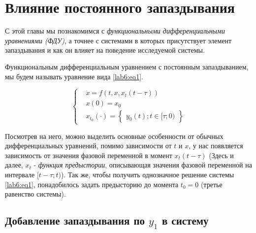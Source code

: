 %
%
\chapter{Влияние постоянного запаздывания}\label{lab6}

С этой главы мы познакомимся с \textit{функциональными дифференциальными
уравнениями (ФДУ)}, а точнее с системами в которых присутствует элемент
запаздывания и как он влияет на поведение исследуемой системы.

\begin{definition}
    Функциональным дифференциальным уравнением с постоянным запаздыванием,
    мы будем называть уравнение вида \ref{lab6:eq1}.
\end{definition}

\begin{equation}\label{lab6:eq1}
    \begin{cases}
        &\dot{x} = f(t, x, x_t(t - \tau)) \\
        &x(0) = x_0 \\
        &x_{t_0}(\cdot) = \begin{Bmatrix}y_0(t); t \in [\tau;0)\end{Bmatrix}
    \end{cases}
\end{equation}

Посмотрев на него, можно выделить основные особенности от обычных дифференциальных
уравнений, помимо зависимости от $t$ и $x$, у нас появляется зависимость от
значения фазовой переменной в момент $x_t(t-\tau)$ (Здесь и далее, $x_t$ - \textit{функция
предыстории}, описывающая значения фазовой переменной на интервале $[t-\tau;t)$).
Так же, чтобы получить однозначное решение системы \ref{lab6:eq1}, понадобилось
задать предысторию до момента $t_0 = 0$ (третье равенство системы).

\section{Добавление запаздывания по $y_1$ в систему}\label{lab6:y1}

